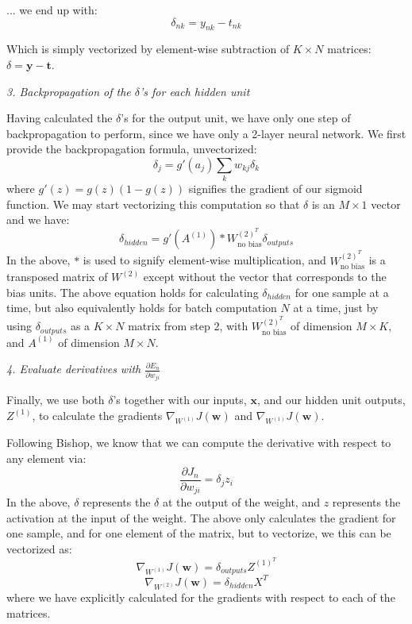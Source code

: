 \documentclass[10pt]{article}
\begin{document}
... we end up with:
%
%
\begin{equation}
\delta_{nk} = y_{nk} - t_{nk}
\end{equation}
%
%

Which is simply vectorized by element-wise subtraction of $K \times N$ matrices: $\delta = \mathbf{y} - \mathbf{t}$.



\textit{3. Backpropagation of the $\delta$'s for each hidden unit}

Having calculated the $\delta$'s for the output unit, we have only one step of backpropagation to perform, since we have only a 2-layer neural network.  We first provide the backpropagation formula, unvectorized:
%
%
\begin{equation}
\delta_j = g'(a_j)\sum_k w_{kj} \delta_k
\end{equation}
%
%
where $g'(z)=g(z)(1-g(z))$ signifies the gradient of our sigmoid function. We may start vectorizing this computation so that $\delta$ is an $M \times 1$ vector and we have:
%
%
\begin{equation}
\delta_{hidden} = g'(A^{(1)}) * W^{(2)^T}_{\text{no bias}} \delta_{outputs}
\end{equation}
%
%
In the above, $*$ is used to signify element-wise multiplication, and $W^{(2)^T}_{\text{no bias}}$ is a transposed matrix of $W^{(2)}$ except without the vector that corresponds to the bias units.  The above equation holds for calculating $\delta_{hidden}$ for one sample at a time, but also equivalently holds for batch computation $N$ at a time, just by using $\delta_{outputs}$ as a $K \times N$ matrix from step 2, with $W^{(2)^T}_{\text{no bias}}$ of dimension $M \times K$, and $A^{(1)}$ of dimension $M \times N$.

\textit{4. Evaluate derivatives with $\frac{\partial E_n}{\partial w_{ji}}$}

Finally, we use both $\delta$'s together with our inputs, $\mathbf{x}$, and our hidden unit outputs, $Z^{(1)}$, to calculate the gradients $\nabla_{W^{(1)}} J(\mathbf{w})$ and $\nabla_{W^{(1)}} J(\mathbf{w})$.

Following Bishop, we know that we can compute the derivative with respect to any element via:
%
%
\begin{equation}
\frac{\partial J_n}{\partial w_{ji}} = \delta_j z_i
\end{equation}
%
%
In the above, $\delta$ represents the $\delta$ at the output of the weight, and $z$ represents the activation at the input of the weight.  The above only calculates the gradient for one sample, and for one element of the matrix, but to vectorize, we this can be vectorized as:
%
%
\begin{equation}
\nabla_{W^{(1)}} J(\mathbf{w}) = \delta_{outputs} Z^{(1)^T}
\end{equation}
%
%
\begin{equation}
\nabla_{W^{(2)}} J(\mathbf{w}) = \delta_{hidden} X^T
\end{equation}
%
%
where we have explicitly calculated for the gradients with respect to each of the matrices.
\end{document}
